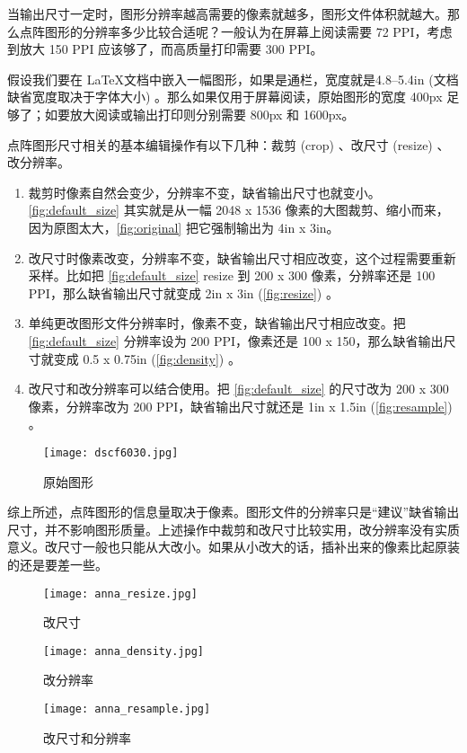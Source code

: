 当输出尺寸一定时，图形分辨率越高需要的像素就越多，图形文件体积就越大。那么点阵图形的分辨率多少比较合适呢？一般认为在屏幕上阅读需要 72 PPI，考虑到放大 150 PPI 应该够了，而高质量打印需要 300 PPI。

假设我们要在 \LaTeX 文档中嵌入一幅图形，如果是通栏，宽度就是4.8--5.4in (文档缺省宽度取决于字体大小) 。那么如果仅用于屏幕阅读，原始图形的宽度 400px 足够了；如要放大阅读或输出打印则分别需要 800px 和 1600px。

点阵图形尺寸相关的基本编辑操作有以下几种：裁剪 (crop) 、改尺寸 (resize) 、改分辨率。

\begin{enumerate}
\item 裁剪时像素自然会变少，分辨率不变，缺省输出尺寸也就变小。\autoref{fig:default_size} 其实就是从一幅 2048 x 1536 像素的大图裁剪、缩小而来，因为原图太大，\autoref{fig:original} 把它强制输出为 4in x 3in。

\item 改尺寸时像素改变，分辨率不变，缺省输出尺寸相应改变，这个过程需要重新采样。比如把 \autoref{fig:default_size} resize 到 200 x 300 像素，分辨率还是 100 PPI，那么缺省输出尺寸就变成 2in x 3in (\autoref{fig:resize}) 。

\item 单纯更改图形文件分辨率时，像素不变，缺省输出尺寸相应改变。把 \autoref{fig:default_size} 分辨率设为 200 PPI，像素还是 100 x 150，那么缺省输出尺寸就变成 0.5 x 0.75in (\autoref{fig:density}) 。

\item 改尺寸和改分辨率可以结合使用。把 \autoref{fig:default_size} 的尺寸改为 200 x 300 像素，分辨率改为 200 PPI，缺省输出尺寸就还是 1in x 1.5in (\autoref{fig:resample}) 。
\end{enumerate}

\begin{figure}[htbp]
\centering
\texttt{[image: dscf6030.jpg]}
\caption{原始图形}
\label{fig:original}
\end{figure}

综上所述，点阵图形的信息量取决于像素。图形文件的分辨率只是“建议”缺省输出尺寸，并不影响图形质量。上述操作中裁剪和改尺寸比较实用，改分辨率没有实质意义。改尺寸一般也只能从大改小。如果从小改大的话，插补出来的像素比起原装的还是要差一些。

\begin{figure}[htbp]
\centering
\begin{minipage}[b]{2in}
\centering
\texttt{[image: anna\_resize.jpg]}
\caption{改尺寸}
\label{fig:resize}
\end{minipage}
\begin{minipage}[b]{1.1in}
\centering
\texttt{[image: anna\_density.jpg]}
\caption{改分辨率}
\label{fig:density}
\end{minipage}
\begin{minipage}[b]{1.6in}
\centering
\texttt{[image: anna\_resample.jpg]}
\caption{改尺寸和分辨率}
\label{fig:resample}
\end{minipage}
\end{figure}

